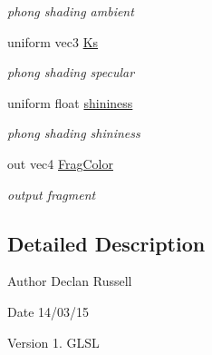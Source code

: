 \begin{DoxyCompactItemize}
\begin{DoxyCompactList}\small\item\em phong shading ambient \end{DoxyCompactList}\item 
\hypertarget{fluid_shader_frag_8glsl_af3912303d262aec3cd9c062ccd9b3ea6}{uniform vec3 \hyperlink{fluid_shader_frag_8glsl_af3912303d262aec3cd9c062ccd9b3ea6}{Ks}}\label{fluid_shader_frag_8glsl_af3912303d262aec3cd9c062ccd9b3ea6}

\begin{DoxyCompactList}\small\item\em phong shading specular \end{DoxyCompactList}\item 
\hypertarget{fluid_shader_frag_8glsl_a166447b6cc208e90b69ba94cba7eacfe}{uniform float \hyperlink{fluid_shader_frag_8glsl_a166447b6cc208e90b69ba94cba7eacfe}{shininess}}\label{fluid_shader_frag_8glsl_a166447b6cc208e90b69ba94cba7eacfe}

\begin{DoxyCompactList}\small\item\em phong shading shininess \end{DoxyCompactList}\item 
\hypertarget{fluid_shader_frag_8glsl_af5639df2ce0dea4170bb8b47a599911e}{out vec4 \hyperlink{fluid_shader_frag_8glsl_af5639df2ce0dea4170bb8b47a599911e}{Frag\-Color}}\label{fluid_shader_frag_8glsl_af5639df2ce0dea4170bb8b47a599911e}

\begin{DoxyCompactList}\small\item\em output fragment \end{DoxyCompactList}\end{DoxyCompactItemize}


\subsection{Detailed Description}
\begin{DoxyAuthor}{Author}
Declan Russell 
\end{DoxyAuthor}
\begin{DoxyDate}{Date}
14/03/15 
\end{DoxyDate}
\begin{DoxyVersion}{Version}
1.  G\-L\-S\-L 
\end{DoxyVersion}



